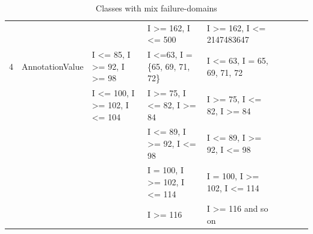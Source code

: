 \begin{table}[h]
{{\begin{tabular}{|l|l|l|l|l|l|l|l|l|}
	&                               			& 										& I \textgreater= 162, I \textless= 500							& I \textgreater= 162, I \textless= 2147483647						   	    \\	
4	& AnnotationValue			& I \textless= 85, I \textgreater= 92, I \textgreater= 98		& I \textless=63, I = \{65, 69, 71, 72\}			& I \textless= 63, I = {65, 69, 71, 72}										     \\
	&                              			& I \textless= 100, I \textgreater= 102, I \textless= 104	& I \textgreater= 75, I \textless= 82, I \textgreater= 84	& I \textgreater= 75, I \textless= 82, I \textgreater= 84 					     \\	
	&                               			& 										& I \textless= 89, I \textgreater= 92, I \textless= 98			& I \textless= 89, I \textgreater= 92, I \textless= 98 	\\	
	&                               			& 										& I = 100, I \textgreater= 102, I \textless= 114					& I = 100, I \textgreater= 102, I \textless= 114 		\\	
	&                               			& 										& I \textgreater= 116											& I \textgreater= 116 and so on  						\\	


	
\hline
\end{tabular}
}
}
\bigskip
\caption{Classes with mix failure-domains}
\label{table:mixDomains}
\end{table}
